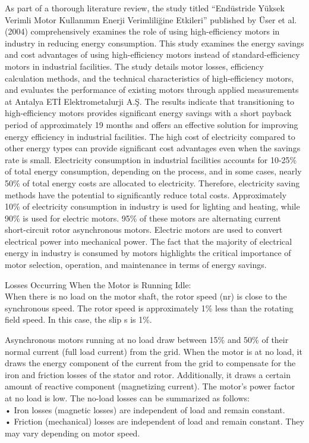 As part of a thorough literature review, the study titled “Endüstride Yüksek Verimli Motor Kullanımın Enerji Verimliliğine Etkileri” published by Üser et al. (2004) comprehensively examines the role of using high-efficiency motors in industry in reducing energy consumption. This study examines the energy savings and cost advantages of using high-efficiency motors instead of standard-efficiency motors in industrial facilities. The study details motor losses, efficiency calculation methods, and the technical characteristics of high-efficiency motors, and evaluates the performance of existing motors through applied measurements at Antalya ETİ Elektrometalurji A.Ş. The results indicate that transitioning to high-efficiency motors provides significant energy savings with a short payback period of approximately 19 months and offers an effective solution for improving energy efficiency in industrial facilities. The high cost of electricity compared to other energy types can provide significant cost advantages even when the savings rate is small. Electricity consumption in industrial facilities accounts for 10-25\% of total energy consumption, depending on the process, and in some cases, nearly 50\% of total energy costs are allocated to electricity. Therefore, electricity saving methods have the potential to significantly reduce total costs. Approximately 10\% of electricity consumption in industry is used for lighting and heating, while 90\% is used for electric motors. 95\% of these motors are alternating current short-circuit rotor asynchronous motors. Electric motors are used to convert electrical power into mechanical power. The fact that the majority of electrical energy in industry is consumed by motors highlights the critical importance of motor selection, operation, and maintenance in terms of energy savings.

{Losses Occurring When the Motor is Running Idle}: \\
When there is no load on the motor shaft, the rotor speed (nr) is close to the synchronous speed. The rotor speed is approximately 1\% less than the rotating field speed. In this case, the slip s is 1\%.

Asynchronous motors running at no load draw between 15\% and 50\% of their normal current (full load current) from the grid. When the motor is at no load, it draws the energy component of the current from the grid to compensate for the iron and friction losses of the stator and rotor. Additionally, it draws a certain amount of reactive component (magnetizing current). The motor's power factor at no load is low. The no-load losses can be summarized as follows: \\
• Iron losses (magnetic losses) are independent of load and remain constant.\\
• Friction (mechanical) losses are independent of load and remain constant. They may vary depending on motor speed.


